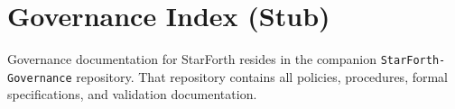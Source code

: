 

\section{Governance Index (Stub)}

Governance documentation for StarForth resides in the companion
\texttt{StarForth-Governance} repository. That repository contains all policies,
procedures, formal specifications, and validation documentation.

